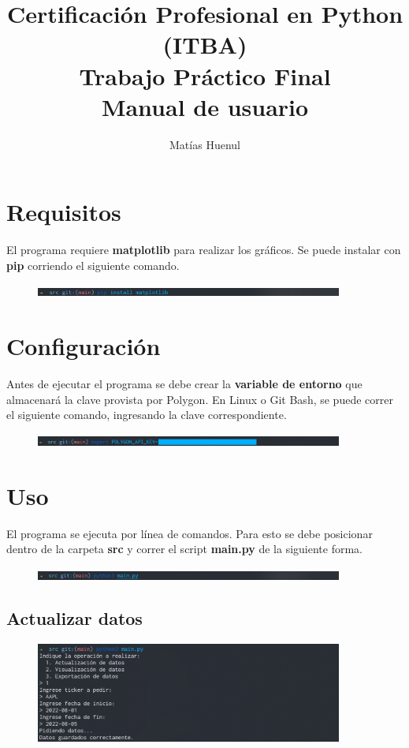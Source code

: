 \documentclass{article}
\title{Certificación Profesional en Python (ITBA) \\
Trabajo Práctico Final\\
Manual de usuario}
\author{Matías Huenul}
\date{}
\begin{document}
\maketitle
\tableofcontents
\newpage

\section{Requisitos}
El programa requiere \textbf{matplotlib} para realizar los
gráficos. Se puede instalar con \textbf{pip} corriendo el siguiente comando.
\begin{figure}[H]
\centering
\includegraphics[width=0.9\textwidth]{img/instalacion_matplotlib.png}
\end{figure}

\section{Configuración}
Antes de ejecutar el programa se debe crear la \textbf{variable de entorno}
que almacenará la clave provista por Polygon. En Linux o Git Bash, se puede
correr el siguiente comando, ingresando la clave correspondiente.
\begin{figure}[H]
\centering
\includegraphics[width=0.9\textwidth]{img/configuracion_api_key.png}
\end{figure}

\section{Uso}
El programa se ejecuta por línea de comandos. Para esto se debe posicionar
dentro de la carpeta \textbf{src} y correr el script \textbf{main.py} de la
siguiente forma.
\begin{figure}[H]
\centering
\includegraphics[width=0.9\textwidth]{img/ejecucion_del_programa.png}
\end{figure}

\subsection{Actualizar datos}
\begin{figure}[H]
\centering
\includegraphics[width=0.9\textwidth]{img/actualizacion_de_datos.png}
\end{figure}
\end{document}
